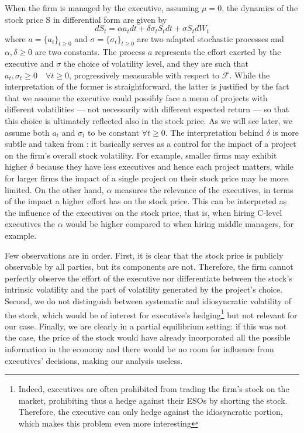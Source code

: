When the firm is managed by the executive, assuming $\mu = 0$, the dynamics of the stock price S in differential form are given by 
$$ dS_t = \alpha a_t dt + \delta \sigma_t S_t dt + \sigma S_t dW_t $$
where $a = \{a_t\}_{t \ge 0}$ and $\sigma = \{\sigma_t\}_{t \ge 0}$ are two adapted stochastic processes and $\alpha, \delta \ge 0$ are two constants. The process $a$ represents the effort exerted by the executive and $\sigma$ the choice of volatility level, and they are such that $a_t, \sigma_t \ge 0 \quad \forall t \ge 0$, progressively measurable with respect to $\mathscr{F}$. While the interpretation of the former is straightforward, the latter is justified by the fact that we assume the executive could possibly face a menu of projects with different volatilities --- not necessarily with different expected return --- so that this choice is ultimately reflected also in the stock price. As we will see later, we assume both $a_t$ and $\sigma_t$ to be constant $\forall t\ge0$.
The interpretation behind $\delta$ is more subtle and taken from \cite{cadenillas2005executive}: it basically serves as a control for the impact of a project on the firm's overall stock volatility. For example, smaller firms may exhibit higher $\delta$ because they have less executives and hence each project matters, while for larger firms the impact of a single project on their stock price may be more limited. On the other hand, $\alpha$ measures the relevance of the executives, in terms of the impact a higher effort has on the stock price. This can be interpreted as the influence of the executives on the stock price, that is, when hiring C-level executives the $\alpha$ would be higher compared to when hiring middle managers, for example.

Few observations are in order. First, it is clear that the stock price is publicly observable by all parties, but its components are not. Therefore, the firm cannot perfectly observe the effort of the executive nor differentiate between the stock's intrinsic volatility and the part of volatility generated by the project's choice. Second, we do not distinguish between systematic and idiosyncratic volatility of the stock, which would be of interest for executive's hedging\footnote{Indeed, executives are often prohibited from trading the firm's stock on the market, prohibiting thus a hedge against their ESOs by shorting the stock. Therefore, the executive can only hedge against the idiosyncratic portion, which makes this problem even more interesting} but not relevant for our case. Finally, we are clearly in a partial equilibrium setting: if this was not the case, the price of the stock would have already incorporated all the possible information in the economy and there would be no room for influence from executives' decisions, making our analysis useless.



